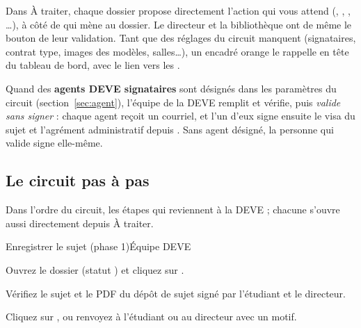 \documentclass[11pt,a4paper]{article}
\begin{document}

Dans \og À traiter\fg{}, chaque dossier propose directement l'action qui vous
attend (, , , \ldots), à côté de  qui mène au dossier. Le
directeur et la bibliothèque ont de même le bouton de leur validation. Tant
que des réglages du circuit manquent (signataires, contrat type, images des
modèles, salles\ldots), un encadré orange le rappelle en tête du tableau de
bord, avec le lien vers les .


\begin{astuce}
Quand des \textbf{agents DEVE signataires} sont désignés dans les paramètres du
circuit (section~\ref{sec:agent}), l'équipe de la DEVE remplit et vérifie, puis
\emph{valide sans signer} : chaque agent reçoit un courriel, et l'un d'eux signe
ensuite le visa du sujet et l'agrément administratif depuis . Sans agent
désigné, la personne qui valide signe elle-même.
\end{astuce}

\subsection{Le circuit pas à pas}\label{sec:circuitdeve}

Dans l'ordre du circuit, les étapes qui reviennent à la DEVE ; chacune s'ouvre
aussi directement depuis \og À traiter\fg{}.

\begin{procedure}{Enregistrer le sujet (phase 1)}{Équipe DEVE}
\begin{etapes}
  \item Ouvrez le dossier (statut ) et
        cliquez sur .
  \item Vérifiez le sujet et le PDF du dépôt de sujet signé par l'étudiant et
        le directeur.
  \item Cliquez sur , ou renvoyez à l'étudiant ou
        au directeur avec un motif.
\end{etapes}
\end{procedure}
\end{document}
